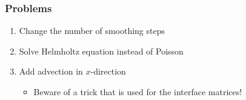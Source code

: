 \begin{frame}
  \frametitle{Problems}
  \begin{enumerate}
  \item Change the number of smoothing steps
  \item Solve Helmholtz equation instead of Poisson
  \item Add advection in $x$-direction
    \begin{itemize}
    \item Beware of a trick that is used for the interface matrices!
    \end{itemize}
  \end{enumerate}
\end{frame}
